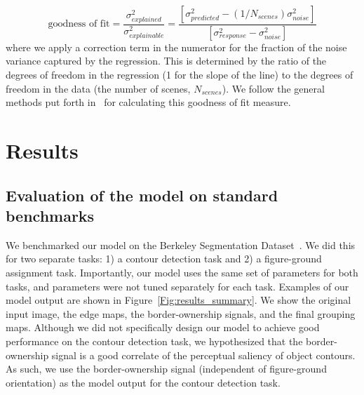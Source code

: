 \begin{equation}
\text{goodness of fit} = \frac{\sigma^2_{explained}}{\sigma^2_{explainable}} = \frac{[\sigma^2_{predicted}-(1/N_{scenes})\sigma^2_{noise}]}{[\sigma^2_{response}-\sigma^2_{noise}]}
\label{eq:gof}
\end{equation}
where we apply a correction term in the numerator for the fraction of the noise variance captured by the regression. This is determined by the ratio of the degrees of freedom in the regression (1 for the slope of the line) to the degrees of freedom in the data (the number
of scenes, $N_{scenes}$). We follow the general methods put forth in~\citet{DiCarlo_etal98} for calculating this goodness of fit measure.

\section{Results}
\label{sec:results}

\subsection{Evaluation of the model on standard benchmarks}
We benchmarked our model on the Berkeley Segmentation Dataset~\citep{Martin_etal01}. We did this for two separate tasks: 1) a contour detection task and 2) a figure-ground assignment task. Importantly, our model uses the same set of parameters for both tasks, and parameters were not tuned separately for each task. Examples of our model output are shown in Figure~\ref{Fig:results_summary}. We show the original input image, the edge maps, the border-ownership signals, and the final grouping maps. Although we did not specifically design our model to achieve good performance on the contour detection task, we hypothesized that the border-ownership signal is a good correlate of the perceptual saliency of object contours. As such, we use the border-ownership signal (independent of figure-ground orientation) as the model output for the contour detection task.


